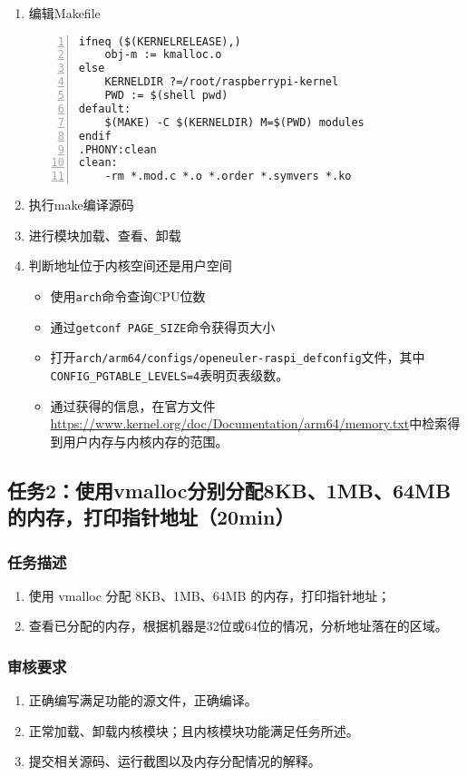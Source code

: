 \documentclass{article}
\begin{document}
\begin{enumerate}
\begin{lstlisting}[numbers=left]
\end{lstlisting}
    \item 编辑Makefile
    \begin{lstlisting}[numbers=left]
ifneq ($(KERNELRELEASE),)
	obj-m := kmalloc.o
else
	KERNELDIR ?=/root/raspberrypi-kernel
	PWD := $(shell pwd)
default:
	$(MAKE) -C $(KERNELDIR) M=$(PWD) modules
endif
.PHONY:clean
clean:
	-rm *.mod.c *.o *.order *.symvers *.ko
    \end{lstlisting}
    \item 执行make编译源码
    \item 进行模块加载、查看、卸载
    \item 判断地址位于内核空间还是用户空间
\begin{itemize}
    \item 使用\verb|arch|命令查询CPU位数
    \item 通过\verb|getconf PAGE_SIZE|命令获得页大小
    \item 打开\verb|arch/arm64/configs/openeuler-raspi_defconfig|文件，其中\\ \verb|CONFIG_PGTABLE_LEVELS=4|表明页表级数。
    \item 通过获得的信息，在官方文件\url{https://www.kernel.org/doc/Documentation/arm64/memory.txt}中检索得到用户内存与内核内存的范围。
\end{itemize}
\end{enumerate}
\newpage

\subsection{任务2：使用vmalloc分别分配8KB、1MB、64MB的内存，打印指针地址（20min）}
\subsubsection{任务描述}
\begin{enumerate}
    \item 使用 vmalloc 分配 8KB、1MB、64MB 的内存，打印指针地址；
    \item 查看已分配的内存，根据机器是32位或64位的情况，分析地址落在的区域。
\end{enumerate}
\subsubsection{审核要求}
\begin{enumerate}
    \item 正确编写满足功能的源文件，正确编译。
    \item 正常加载、卸载内核模块；且内核模块功能满足任务所述。
    \item 提交相关源码、运行截图以及内存分配情况的解释。
\end{enumerate}
\end{document}
